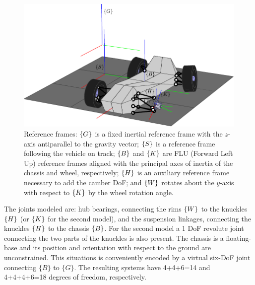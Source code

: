 \begin{figure}[t]
	\centering
	\includegraphics[scale = 0.8]{Images/vehicle_frames}
	\caption{Reference frames: $\left\{G\right\}$ is a fixed inertial reference frame with the $z$-axis antiparallel to the gravity vector; $\left\{S\right\}$ is a reference frame following the vehicle on track; $\left\{B\right\}$ and $\left\{K\right\}$ are FLU (Forward Left Up) reference frames aligned with the principal axes of inertia of the chassis and wheel, respectively; $\left\{H\right\}$ is an auxiliary reference frame necessary to add the camber DoF; and $\left\{W\right\}$ rotates about the $y$-axis with respect to $\left\{K\right\}$ by the wheel rotation angle.}
	\label{fig:frames}
\end{figure}

The joints modeled are: hub bearings, connecting the rims $\left\{W\right\}$ to the knuckles $\left\{H\right\}$ (or $\left\{K\right\}$ for the second model), and the suspension linkages, connecting the knuckles $\left\{H\right\}$ to the chassis $\left\{B\right\}$. For the second model a 1 DoF revolute joint connecting the two parts of the knuckles is also present. The chassis is a floating-base and its position and orientation with respect to the ground are unconstrained. This situations is conveniently encoded by a virtual six-DoF joint connecting $\{B\}$ to $\{G\}$. The resulting systems have 4+4+6=14 and 4+4+4+6=18 degrees of freedom, respectively.

